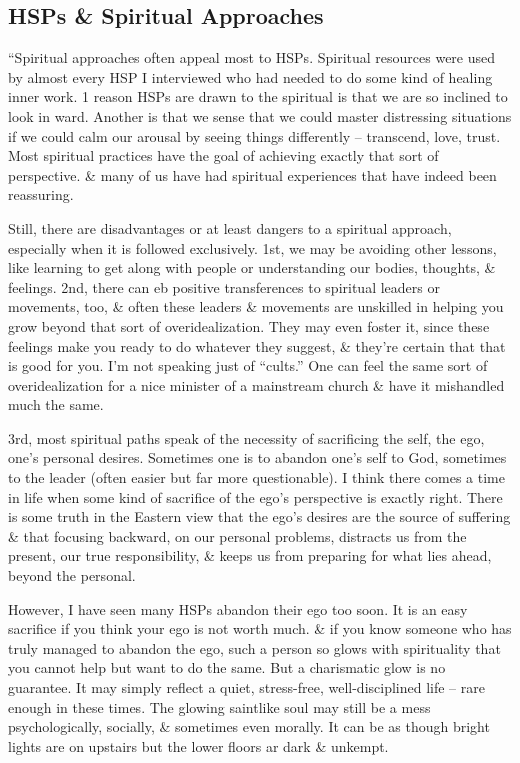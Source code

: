 \documentclass{article}
\numberwithin{equation}{section}
\begin{document}
\subsection{HSPs \& Spiritual Approaches}
``Spiritual approaches often appeal most to HSPs. Spiritual resources were used by almost every HSP I interviewed who had needed to do some kind of healing inner work. 1 reason HSPs are drawn to the spiritual is that we are so inclined to look in ward. Another is that we sense that we could master distressing situations if we could calm our arousal by seeing things differently -- transcend, love, trust. Most spiritual practices have the goal of achieving exactly that sort of perspective. \& many of us have had spiritual experiences that have indeed been reassuring.

Still, there are disadvantages or at least dangers to a spiritual approach, especially when it is followed exclusively. 1st, we may be avoiding other lessons, like learning to get along with people or understanding our bodies, thoughts, \& feelings. 2nd, there can eb positive transferences to spiritual leaders or movements, too, \& often these leaders \& movements are unskilled in helping you grow beyond that sort of overidealization. They may even foster it, since these feelings make you ready to do whatever they suggest, \& they're certain that that is good for you. I'm not speaking just of ``cults.'' One can feel the same sort of overidealization for a nice minister of a mainstream church \& have it mishandled much the same.

3rd, most spiritual paths speak of the necessity of sacrificing the self, the ego, one's personal desires. Sometimes one is to abandon one's self to God, sometimes to the leader (often easier but far more questionable). I think there comes a time in life when some kind of sacrifice of the ego's perspective is exactly right. There is some truth in the Eastern view that the ego's desires are the source of suffering \& that focusing backward, on our personal problems, distracts us from the present, our true responsibility, \& keeps us from preparing for what lies ahead, beyond the personal.

However, I have seen many HSPs abandon their ego too soon. It is an easy sacrifice if you think your ego is not worth much. \& if you know someone who has truly managed to abandon the ego, such a person so glows with spirituality that you cannot help but want to do the same. But a charismatic glow is no guarantee. It may simply reflect a quiet, stress-free, well-disciplined life -- rare enough in these times. The glowing saintlike soul may still be a mess psychologically, socially, \& sometimes even morally. It can be as though bright lights are on upstairs but the lower floors ar dark \& unkempt.
\end{document}
